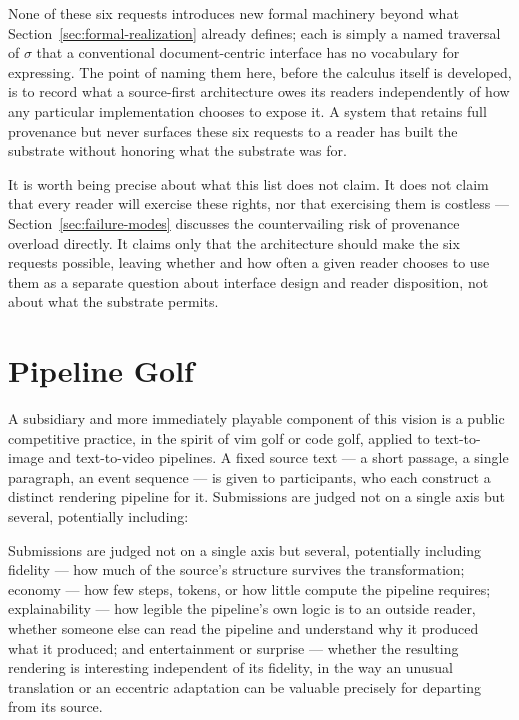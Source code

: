 \documentclass[11pt]{article}
\theoremstyle{definition}
\begin{document}
None of these six requests introduces new formal machinery beyond what Section~\ref{sec:formal-realization} already defines; each is simply a named traversal of $\sigma$ that a conventional document-centric interface has no vocabulary for expressing. The point of naming them here, before the calculus itself is developed, is to record what a source-first architecture owes its readers independently of how any particular implementation chooses to expose it. A system that retains full provenance but never surfaces these six requests to a reader has built the substrate without honoring what the substrate was for.

It is worth being precise about what this list does not claim. It does not claim that every reader will exercise these rights, nor that exercising them is costless --- Section~\ref{sec:failure-modes} discusses the countervailing risk of provenance overload directly. It claims only that the architecture should make the six requests possible, leaving whether and how often a given reader chooses to use them as a separate question about interface design and reader disposition, not about what the substrate permits.

\section{Pipeline Golf}
\label{sec:pipeline-golf}

A subsidiary and more immediately playable component of this vision is a public competitive practice, in the spirit of vim golf or code golf, applied to text-to-image and text-to-video pipelines. A fixed source text --- a short passage, a single paragraph, an event sequence --- is given to participants, who each construct a distinct rendering pipeline for it. Submissions are judged not on a single axis but several, potentially including:

Submissions are judged not on a single axis but several, potentially including fidelity --- how much of the source's structure survives the transformation; economy --- how few steps, tokens, or how little compute the pipeline requires; explainability --- how legible the pipeline's own logic is to an outside reader, whether someone else can read the pipeline and understand why it produced what it produced; and entertainment or surprise --- whether the resulting rendering is interesting independent of its fidelity, in the way an unusual translation or an eccentric adaptation can be valuable precisely for departing from its source.
\end{document}
